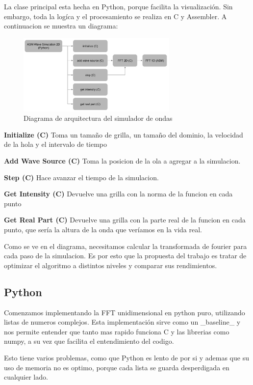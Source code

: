 \documentclass[a4paper]{article}
\begin{document}
La clase principal esta hecha en Python, porque facilita la visualización. Sin embargo, toda la logíca y el procesamiento se realiza
en C y Assembler. A continuacion se muestra un diagrama:
\begin{figure}[h]
    \centering
    \includegraphics[width=0.7\textwidth]{images/image.png}
    \caption{Diagrama de arquitectura del simulador de ondas}
    \label{fig:wave_sim_architecture}
\end{figure}

\textbf{Initialize (C)}
Toma un tamaño de grilla, un tamaño del dominio, la velocidad de la hola y el intervalo de tiempo

\textbf{Add Wave Source (C)}
Toma la posicion de la ola a agregar a la simulacion.

\textbf{Step (C)}
Hace avanzar el tiempo de la simulacion.

\textbf{Get Intensity (C)}
Devuelve una grilla con la norma de la funcion en cada punto

\textbf{Get Real Part (C)}
Devuelve una grilla con la parte real de la funcion en cada punto, que sería la altura de la onda que veríamos en la vida real.

Como se ve en el diagrama, necesitamos calcular la transformada de fourier para cada paso de la simulacion. Es por esto que la
propuesta del trabajo es tratar de optimizar el algoritmo a distintos niveles y comparar sus rendimientos.

\subsection{Python}
Comenzamos implementando la FFT unidimensional en python puro, utilizando listas de numeros complejos. Esta implementación sirve
como un _baseline_ y nos permite entender que tanto mas rapido funciona C y las librerias como numpy, a su vez que facilita
el entendimiento del codigo.

Esto tiene varios problemas, como que Python es lento de por si y ademas que su uso de memoria no es optimo, porque cada lista se
guarda desperdigada en cualquier lado.
\end{document}
